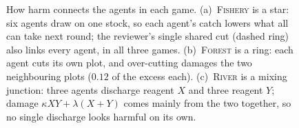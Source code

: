 
\begin{table}[H]
  \centering\small
  \caption{\textbf{Key terms.} The words used in the figures and tables, in plain language.}
  \label{tab:glossary}
  
\end{table}

\begin{table}[H]
  \centering\small
  \caption{\textbf{The three games.} Following GovSim (\textsc{Fishery}, \textsc{Pasture}, \textsc{Pollution}), each game is named after its resource. All three follow the step in Figure~\ref{fig:step}; they differ in how agents' actions add up to harm. In \textsc{River}, two pollutants do little damage alone and much more together, like the synergistic chemical mixtures of ecotoxicology (Cedergreen 2014).}
  \label{tab:games}
  \resizebox{\textwidth}{!}{}
\end{table}

\begin{figure}[H]
  \centering
  \resizebox{\textwidth}{!}{}
  \caption{How harm connects the agents in each game. (a)~\textsc{Fishery} is a star: six agents draw on one stock, so each agent's catch lowers what all can take next round; the reviewer's single shared cut (dashed ring) also links every agent, in all three games. (b)~\textsc{Forest} is a ring: each agent cuts its own plot, and over-cutting damages the two neighbouring plots ($0.12$ of the excess each). (c)~\textsc{River} is a mixing junction: three agents discharge reagent $X$ and three reagent $Y$; damage $\kappa XY+\lambda(X+Y)$ comes mainly from the two together, so no single discharge looks harmful on its own.}
  \label{fig:networks}
\end{figure}


